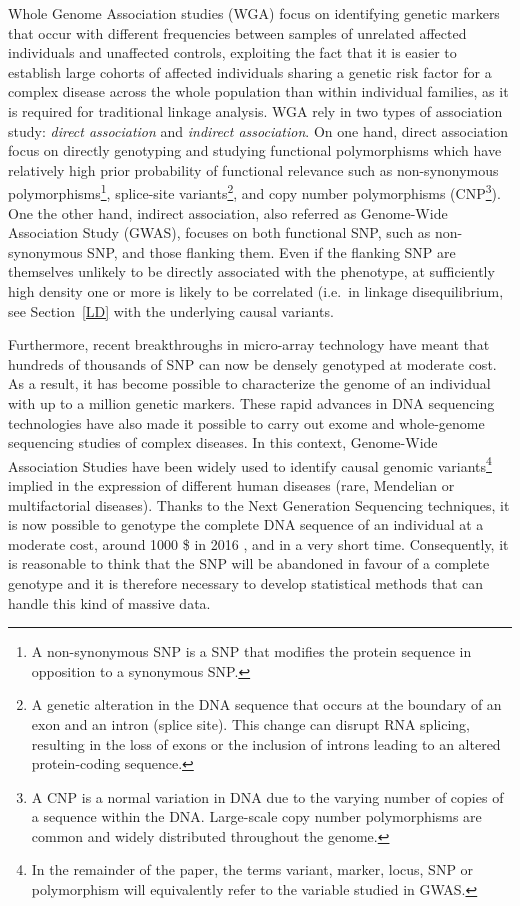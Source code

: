 \documentclass[]{book}
\begin{document}
Whole Genome Association studies (WGA) focus on identifying genetic
markers that occur with different frequencies between samples of
unrelated affected individuals and unaffected controls, exploiting the
fact that it is easier to establish large cohorts of affected
individuals sharing a genetic risk factor for a complex disease across
the whole population than within individual families, as it is required
for traditional linkage analysis. WGA rely in two types of association
study: \emph{direct association} and \emph{indirect association}. On one hand,
direct association focus on directly genotyping and studying functional
polymorphisms which have relatively high prior probability of functional
relevance such as non-synonymous polymorphisms\footnote{A non-synonymous SNP is a SNP that modifies the protein sequence
  in opposition to a synonymous SNP.}, splice-site
variants\footnote{A genetic alteration in the DNA sequence that occurs at the
  boundary of an exon and an intron (splice site). This change can
  disrupt RNA splicing, resulting in the loss of exons or the
  inclusion of introns leading to an altered protein-coding sequence.}, and copy number polymorphisms (CNP\footnote{A CNP is a normal variation in DNA due to the varying number of
  copies of a sequence within the DNA. Large-scale copy number
  polymorphisms are common and widely distributed throughout the
  genome.}). One the other
hand, indirect association, also referred as Genome-Wide Association
Study (GWAS), focuses on both functional SNP, such as non-synonymous
SNP, and those flanking them. Even if the flanking SNP are themselves
unlikely to be directly associated with the phenotype, at sufficiently
high density one or more is likely to be correlated (i.e.~in linkage
disequilibrium, see Section~\ref{LD} with the underlying causal
variants.

Furthermore, recent breakthroughs in micro-array technology have meant
that hundreds of thousands of SNP can now be densely genotyped at
moderate cost. As a result, it has become possible to characterize the
genome of an individual with up to a million genetic markers. These
rapid advances in DNA sequencing technologies have also made it possible
to carry out exome and whole-genome sequencing studies of complex
diseases. In this context, Genome-Wide Association Studies have been
widely used to identify causal genomic variants\footnote{In the remainder of the paper, the terms variant, marker, locus,
  SNP or polymorphism will equivalently refer to the variable studied
  in GWAS.} implied in the
expression of different human diseases (rare, Mendelian or
multifactorial diseases). Thanks to the Next Generation Sequencing
techniques, it is now possible to genotype the complete DNA sequence of
an individual at a moderate cost, around 1000 \$ in 2016 \citep{NGS}, and in
a very short time. Consequently, it is reasonable to think that the SNP
will be abandoned in favour of a complete genotype and it is therefore
necessary to develop statistical methods that can handle this kind of
massive data.
\end{document}
